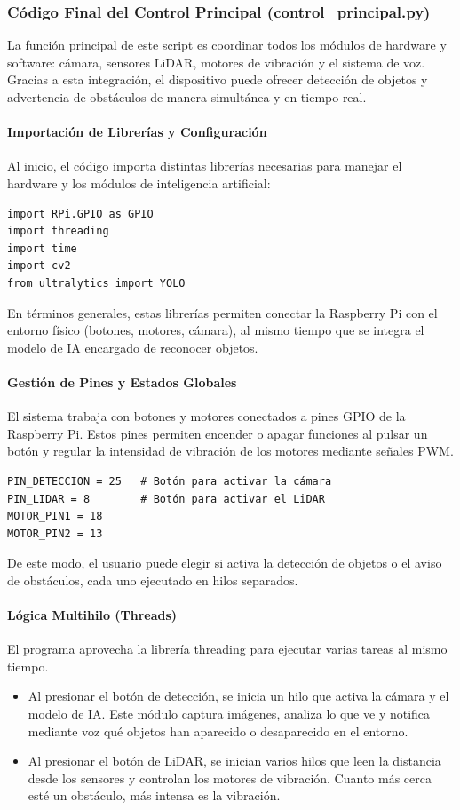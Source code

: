 \documentclass[12pt,a4paper]{article}
\begin{document}
\subsubsection{Código Final del Control Principal (control\_principal.py)}

La función principal de este script es coordinar todos los módulos de hardware y software: cámara, sensores LiDAR, motores de vibración y el sistema de voz. Gracias a esta integración, el dispositivo puede ofrecer detección de objetos y advertencia de obstáculos de manera simultánea y en tiempo real.

\paragraph{Importación de Librerías y Configuración}
Al inicio, el código importa distintas librerías necesarias para manejar el hardware y los módulos de inteligencia artificial:

\begin{verbatim}
import RPi.GPIO as GPIO
import threading
import time
import cv2
from ultralytics import YOLO
\end{verbatim}

En términos generales, estas librerías permiten conectar la Raspberry Pi con el entorno físico (botones, motores, cámara), al mismo tiempo que se integra el modelo de IA encargado de reconocer objetos.

\paragraph{Gestión de Pines y Estados Globales}
El sistema trabaja con botones y motores conectados a pines GPIO de la Raspberry Pi. Estos pines permiten encender o apagar funciones al pulsar un botón y regular la intensidad de vibración de los motores mediante señales PWM.

\begin{verbatim}
PIN_DETECCION = 25   # Botón para activar la cámara
PIN_LIDAR = 8        # Botón para activar el LiDAR
MOTOR_PIN1 = 18
MOTOR_PIN2 = 13
\end{verbatim}

De este modo, el usuario puede elegir si activa la detección de objetos o el aviso de obstáculos, cada uno ejecutado en hilos separados.

\paragraph{Lógica Multihilo (Threads)}
El programa aprovecha la librería threading para ejecutar varias tareas al mismo tiempo.  
\begin{itemize}
    \item Al presionar el botón de detección, se inicia un hilo que activa la cámara y el modelo de IA. Este módulo captura imágenes, analiza lo que ve y notifica mediante voz qué objetos han aparecido o desaparecido en el entorno.
    \item Al presionar el botón de LiDAR, se inician varios hilos que leen la distancia desde los sensores y controlan los motores de vibración. Cuanto más cerca esté un obstáculo, más intensa es la vibración.
\end{itemize}
\end{document}
